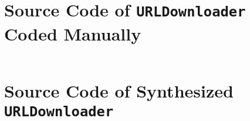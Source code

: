 
\section{Source Code of \texttt{URLDownloader} Coded Manually}
\label{sec:ManualURLDownload}

\inputminted[fontsize=\scriptsize,linenos,breaklines]{java}{../src/ttc15-tranj/src/main/java/ttc15/tranj/examples/ManualURLDownload.java}

\section{Source Code of Synthesized \texttt{URLDownloader}}
\label{sec:SynthesizedURLDownload}

\inputminted[fontsize=\scriptsize,linenos,breaklines]{java}{../src/ttc15-tranj/src/main/java/ttc15/tranj/examples/SynthesizedURLDownload.java}
